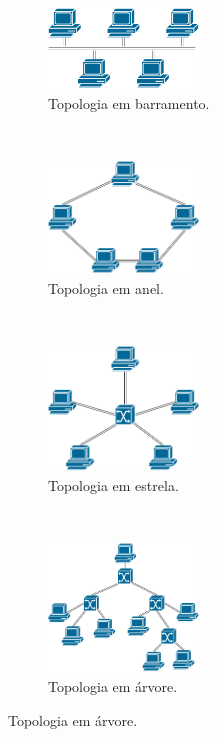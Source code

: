 \begin{figure}[t!]
	\centering
	\begin{subfigure}[t]{0.4\textwidth}
		\centering
		\includegraphics[width=4cm]{./figuras/Topologia-Barramento.pdf} %
		\caption{Topologia em barramento.}
		\label{fig_topologia_multiplo_barramento}
	\end{subfigure}%
	~
	\begin{subfigure}[t]{0.4\textwidth}
		\centering
		\includegraphics[width=4cm]{./figuras/Topologia-Anel.pdf} %
	\caption{Topologia em anel.}
	\label{fig_topologia_multiplo_barramento_anel}
	\end{subfigure}
	~
	\begin{subfigure}[t]{0.4\textwidth}
		\centering
		\includegraphics[width=4cm]{./figuras/Topologia-Estrela.pdf} %
	\caption{Topologia em estrela.}
	\label{fig_topologia_multiplo_estrela}
	\end{subfigure}
	~
	\begin{subfigure}[t]{0.4\textwidth}
		\centering
		\includegraphics[width=4cm]{./figuras/Topologia-Arvore.pdf} %
	\caption{Topologia em árvore.}
	\label{fig_topologia_multiplo_arvore}

\end{subfigure}
\end{figure}
